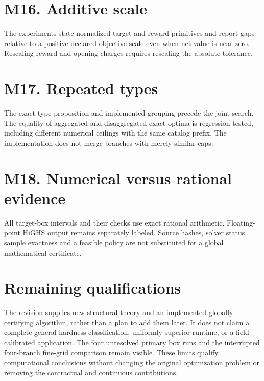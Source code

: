 \documentclass[11pt,letterpaper]{article}
\begin{document}
\section*{M16. Additive scale}
The experiments state normalized target and reward primitives and report gaps relative to a positive declared objective scale even when net value is near zero. Rescaling reward and opening charges requires rescaling the absolute tolerance.

\section*{M17. Repeated types}
The exact type proposition and implemented grouping precede the joint search. The equality of aggregated and disaggregated exact optima is regression-tested, including different numerical ceilings with the same catalog prefix. The implementation does not merge branches with merely similar caps.

\section*{M18. Numerical versus rational evidence}
All target-box intervals and their checks use exact rational arithmetic. Floating-point HiGHS output remains separately labeled. Source hashes, solver status, sample exactness and a feasible policy are not substituted for a global mathematical certificate.

\section*{Remaining qualifications}
The revision supplies new structural theory and an implemented globally certifying algorithm, rather than a plan to add them later. It does not claim a complete general hardness classification, uniformly superior runtime, or a field-calibrated application. The four unresolved primary box runs and the interrupted four-branch fine-grid comparison remain visible. These limits qualify computational conclusions without changing the original optimization problem or removing the contractual and continuous contributions.
\end{document}
